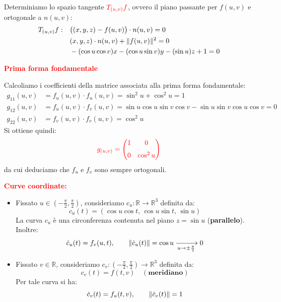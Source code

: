 \begin{esempio}
        Determiniamo lo spazio tangente $\textcolor{red}{T_{(u,v)}f}$, ovvero il piano passante per $f(u,v)$ e ortogonale a $n(u,v)$:
        \begin{align*}
        T_{(u,v)}f : \quad &\big((x,y,z) - f(u,v)\big) \cdot n(u,v) = 0 \\
        &(x,y,z) \cdot n(u,v) + \lVert f(u,v)\rVert^2 = 0 \\
        &-(\cos u \cos v)x - (\cos u \sin v)y - (\sin u)z + 1 = 0
        \end{align*}

        \bigskip
        \noindent \textcolor{red}{\textbf{Prima forma fondamentale}}

        Calcoliamo i coefficienti della matrice associata alla prima forma fondamentale:
        \begin{align*}
        g_{11}(u,v) &= f_u(u,v) \cdot f_u(u,v) = \sin^2 u + \cos^2 u = 1 \\[4pt]
        g_{12}(u,v) &= f_u(u,v) \cdot f_v(u,v) = \sin u \cos u \sin v \cos v - \sin u \sin v \cos u \cos v = 0 \\[4pt]
        g_{22}(u,v) &= f_v(u,v) \cdot f_v(u,v) = \cos^2 u
        \end{align*}
        Si ottiene quindi:
        \[
        \textcolor{red}{g_{(u,v)} = 
        \begin{pmatrix}
        1 & 0 \\[6pt]
        0 & \cos^2 u
        \end{pmatrix}}
        \]
        da cui deduciamo che $f_u$ e $f_v$ sono sempre ortogonali.

        \bigskip
        \noindent \textcolor{red}{\textbf{Curve coordinate:}}
        \begin{itemize}
            \item[\textcolor{red}{$\bullet$}] Fissato $u \in \left(-\frac{\pi}{2}, \frac{\pi}{2}\right)$, consideriamo $c_u : \mathbb{R} \longrightarrow \mathbb{R}^3$ definita da:
            \[
            c_u(t) = (\cos u \cos t, \, \cos u \sin t, \, \sin u)
            \]
            La curva $c_u$ è una circonferenza contenuta nel piano $z = \sin u$ (\textbf{parallelo}). Inoltre:
            \[
            \dot{c}_u(t) = f_v(u,t), \qquad \lVert\dot{c}_u(t)\rVert = \cos u \xrightarrow[u \to \pm \frac{\pi}{2}]{} 0
            \]
            
            \item[\textcolor{red}{$\bullet$}] Fissato $v \in \mathbb{R}$, consideriamo $c_v : \left(-\frac{\pi}{2}, \frac{\pi}{2}\right) \longrightarrow \mathbb{R}^3$ definita da:
            \[
            c_v(t) = f(t,v) \quad (\textbf{meridiano})
            \]
            Per tale curva si ha:
            \[
            \dot{c}_v(t) = f_u(t,v), \qquad \lVert\dot{c}_v(t)\rVert = 1
            \]
        \end{itemize}


\end{esempio}
